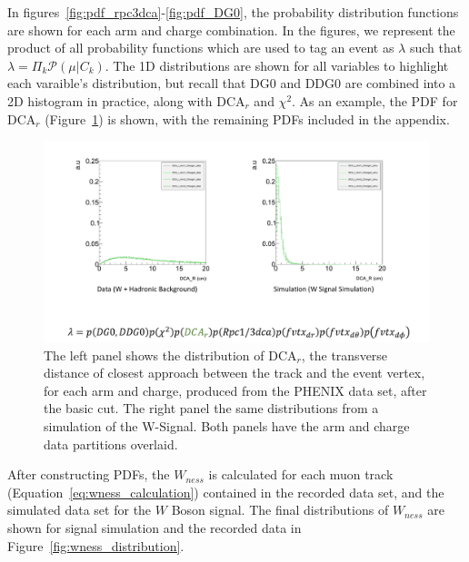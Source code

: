 In figures~\ref{fig:pdf_rpc3dca}-\ref{fig:pdf_DG0}, the probability
distribution functions are shown for each arm and charge combination. In the
figures, we represent the product of all probability functions which are used
to tag an event as $\lambda$ such that $\lambda = \Pi_{k} \mathcal{P}(\mu \vert
C_k)$. The 1D distributions are shown for all variables to highlight each
varaible's distribution, but recall that DG0 and DDG0 are combined into a 2D
histogram in practice, along with DCA$_r$ and $\chi^2$. As an example, the PDF
for DCA$_r$ (Figure~\ref{fig:pdf_dcar}) is shown, with the remaining PDFs
included in the appendix.

\begin{figure}[ht]
  \centering
  \includegraphics[width=\linewidth,trim=4 70 4 4,clip]{./figures/pdf_dcar.png}
  \caption{
		The left panel shows the distribution of DCA$_r$, the transverse distance of
		closest approach between the track and the event vertex, for each arm and
		charge, produced from the PHENIX data set, after the basic cut. The right
		panel the same distributions from a simulation of the W-Signal. Both panels
		have the arm and charge data partitions overlaid.
  }
  \label{fig:pdf_dcar}
\end{figure}

After constructing PDFs, the $W_{ness}$ is calculated for each muon track
(Equation~\ref{eq:wness_calculation}) contained in the recorded data set, and
the simulated data set for the $W$ Boson signal.  The final distributions of
$W_{ness}$ are shown for signal simulation and the recorded data in
Figure~\ref{fig:wness_distribution}.

